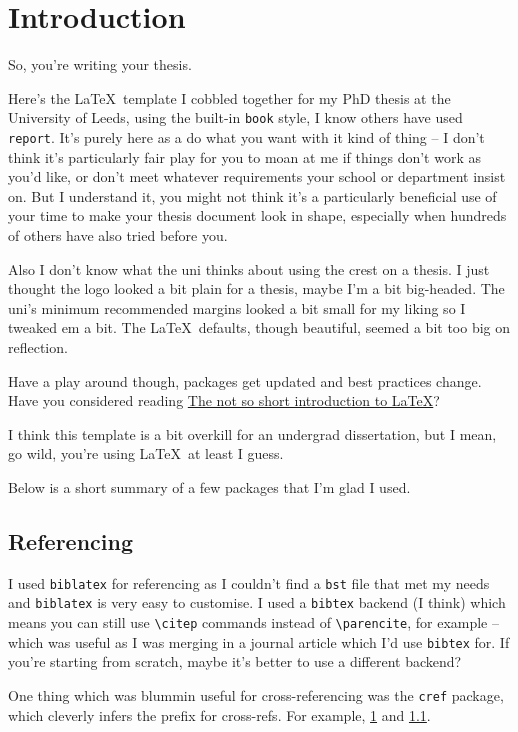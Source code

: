 \chapter{Introduction}
\label{chap:introduction}

So, you're writing your thesis. 

Here's the \LaTeX\ template I cobbled together for my PhD thesis at the University of Leeds, using the built-in \verb|book| style, I know others have used \verb|report|. It's purely here as a do what you want with it kind of thing -- I don't think it's particularly fair play for you to moan at me if things don't work as you'd like, or don't meet whatever requirements your school or department insist on. But I understand it, you might not think it's a particularly beneficial use of your time to make your thesis document look in shape, especially when hundreds of others have also tried before you. 


Also I don't know what the uni thinks about using the crest on a thesis. I just thought the logo looked a bit plain for a thesis, maybe I'm a bit big-headed. The uni's minimum recommended margins looked a bit small for my liking so I tweaked em a bit. The \LaTeX \ defaults, though beautiful, seemed a bit too big on reflection.

Have a play around though, packages get updated and best practices change. Have you considered reading \href{https://tobi.oetiker.ch/lshort/lshort.pdf}{The not so short introduction to \LaTeX}?

I think this template is a bit overkill for an undergrad dissertation, but I mean, go wild, you're using \LaTeX\ at least I guess.

Below is a short summary of a few packages that I'm glad I used.

\section{Referencing}
\label{sec:ref}
I used \verb|biblatex| for referencing as I couldn't find a \verb|bst| file that met my needs and \verb|biblatex| is very easy to customise. I used a \verb|bibtex| backend (I think) which means you can still use \verb|\citep| commands instead of \verb|\parencite|, for example -- which was useful as I was merging in a journal article which I'd use \verb|bibtex| for. If you're starting from scratch, maybe it's better to use a different backend?

One thing which was blummin useful for cross-referencing was the \verb|cref| package, which cleverly infers the prefix for cross-refs. For example, \cref{chap:introduction} and \cref{sec:ref}.

